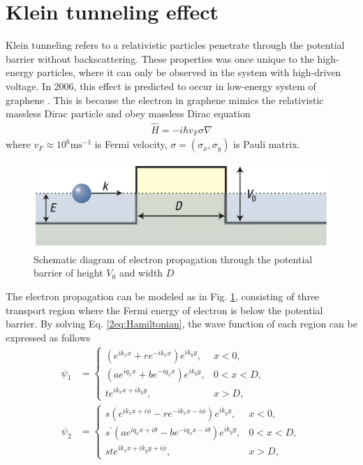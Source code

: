 

\section{Klein tunneling effect} \label{2sec:klein effect}
    Klein tunneling refers to a relativistic particles penetrate through the potential barrier without backscattering.
    These properties was once unique to the high-energy particles, where it can only be observed in the system with high-driven voltage.
    In 2006, this effect is predicted to occur in low-energy system of graphene \cite{Katsnelson2006a}.
    This is because the electron in graphene mimics the relativistic massless Dirac particle and obey massless Dirac equation
    \begin{align} \label{2eq:Hamiltonian}
        \hat{H} = -i\hbar v_F \sigma \nabla 
    \end{align}
    where $v_F \approx 10^6 \mathrm{ms^{-1}}$ is Fermi velocity, $\sigma = (\sigma_x, \sigma_y)$ is Pauli matrix. 
    \begin{figure}[H]
        \centering
        \includegraphics[width=0.7\linewidth]{fig/Chap 2/electron propagation.png}
        \caption{Schematic diagram of electron propagation through the potential barrier of height $V_0$ and width $D$}
        \label{2fig:electron propagation}
    \end{figure}
    The electron propagation can be modeled as in Fig. \ref{2fig:electron propagation}, consisting of three transport region where the Fermi energy of electron is below the potential barrier.
    By solving Eq. \ref{2eq:Hamiltonian}, the wave function of each region can be expressed as follows
    \begin{equation} \label{2eq:wave function}
        \begin{aligned}
            \psi_1 &= \begin{cases} (e^{ik_x x}+re^{-ik_x x})e^{ik_y y}, &x<0,\\
                (ae^{i q_x x}+be^{-i q_x x})e^{ik_y y},  &0<x<D,\\
                te^{ik_x x + ik_y y},  &x>D,
                \end{cases}\\
            \psi_2 &= \begin{cases} s(e^{ik_x x+i \phi}-re^{-ik_x x-i \phi})e^{ik_y y},  &x<0,\\
                s^\prime(ae^{i q_x x+ i \theta}-be^{-i q_x x- i \theta})e^{ik_y y}, &0<x<D,\\
                ste^{ik_x x + ik_y y+ i \phi}, &x>D,
                \end{cases}
        \end{aligned}
    \end{equation}
